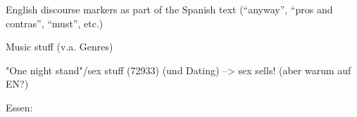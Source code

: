 \begin{comment}
      "By contrast, it was by opposing a social capitalism planned and supervised by the state - treated as obsolete, cramped and constraining - and leaning on the artistic critique (autonomy and creativity) that the new spirit of capitalism gradually took shape at the end of the crisis of the 1960s and 1970s, and undertook to restore the prestige of capitalism. Turning its back on the social demands that had dominated the first half of the 1970s, the new spirit was receptive to the critiques of the period that denounced the mechanization of the world (post-industrial society against industrial society) - the destruction of forms of life conductive to the fulfilment of specifically human potential and, in particular, creativity - and stressed the intolerable character of the .. of oppression which, without necessarily deriving directly from historical capitalism, had been exploited by capitalis mechanisms for organizing .." (p.201)
      "By adapting these sets of demands to the description of a new, liberated and even libertarian way of making profit - which was also said to allow for realization of the self and its most personal aspirations.." (p.201)
      "By helping to overthrow the conventions bound up with the old domestic world, and also to overcome the inflexibilities of the industrial order - bureaucratic hierarchies and standardized production - the artistic critique opened up an opportunity for capitalism to base itself on new forms of control and commodify new, more individualized and 'authentic' goods." (p.467, The Test of the Artistic Critique)
    \end{comment}
  \item English discourse markers as part of the Spanish text  (``anyway'', ``pros and contras'', ``must'', etc.)%
  \item Music stuff (v.a. Genres)
  \item "One night stand"/sex stuff (72933) (und Dating) --> sex sells! (aber warum auf EN?)
  \item Essen:

